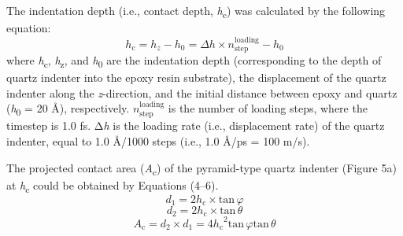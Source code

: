 \documentclass{article}
\begin{document}
The indentation depth (i.e., contact depth, \emph{h}\textsubscript{c}) was calculated by the following equation:
\begin{equation}
h_{\mathrm{c}} = h_z - h_0 = \Delta h \times n_{\mathrm{step}}^{\mathrm{loading}} - h_0 \tag{3}
\end{equation}
where \emph{h}\textsubscript{c}, \emph{h}\textsubscript{z}, and \emph{h}\textsubscript{0} are the indentation depth (corresponding to the depth of quartz indenter into the epoxy resin substrate), the displacement of the quartz indenter along the \emph{z}-direction, and the initial distance between epoxy and quartz (\emph{h}\textsubscript{0} = 20 Å), respectively. $n_{\mathrm{step}}^{\mathrm{loading}}$ is the number of loading steps, where the timestep is 1.0 fs. Δ\emph{h} is the loading rate (i.e., displacement rate) of the quartz indenter, equal to 1.0 Å/1000 steps (i.e., 1.0 Å/ps = 100 m/s).

The projected contact area (\emph{A}\textsubscript{c}) of the pyramid-type quartz indenter (Figure 5a) at \emph{h}\textsubscript{c} could be obtained by Equations (4–6).
\begin{equation}
d_1 = 2h_{\mathrm{c}} \times \mathrm{tan}\,\varphi \tag{4}
\end{equation}
\begin{equation}
d_2 = 2h_{\mathrm{c}} \times \mathrm{tan}\,\theta \tag{5}
\end{equation}
\begin{equation}
A_{\mathrm{c}} = d_2 \times d_1 = 4{h_{\mathrm{c}}}^2 \mathrm{tan}\,\varphi \mathrm{tan}\,\theta \tag{6}
\end{equation}
\end{document}
